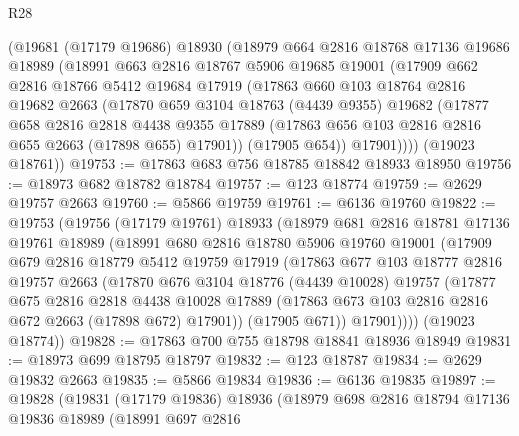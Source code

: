 \begin{lexlean}{R28}
\begin{coremodule}
    (@19681
      (@17179 @19686)
      @18930
      (@18979
        @664
        @2816
        @18768
        @17136
        @19686
        @18989
        (@18991
          @663
          @2816
          @18767
          @5906
          @19685
          @19001
          (@17909
            @662
            @2816
            @18766
            @5412
            @19684
            @17919
            (@17863
              @660
              @103
              @18764
              @2816
              @19682
              @2663
              (@17870
                @659
                @3104
                @18763
                (@4439 @9355)
                @19682
                (@17877
                  @658
                  @2816
                  @2818
                  @4438
                  @9355
                  @17889
                  (@17863 @656 @103 @2816 @2816 @655 @2663 (@17898 @655) @17901))
                (@17905 @654))
              @17901))))
      (@19023 @18761))
@19753 := @17863 @683 @756 @18785 @18842 @18933 @18950
@19756 := @18973 @682 @18782 @18784
@19757 := @123 @18774
@19759 := @2629 @19757 @2663
@19760 := @5866 @19759
@19761 := @6136 @19760
@19822 := @19753
    (@19756
      (@17179 @19761)
      @18933
      (@18979
        @681
        @2816
        @18781
        @17136
        @19761
        @18989
        (@18991
          @680
          @2816
          @18780
          @5906
          @19760
          @19001
          (@17909
            @679
            @2816
            @18779
            @5412
            @19759
            @17919
            (@17863
              @677
              @103
              @18777
              @2816
              @19757
              @2663
              (@17870
                @676
                @3104
                @18776
                (@4439 @10028)
                @19757
                (@17877
                  @675
                  @2816
                  @2818
                  @4438
                  @10028
                  @17889
                  (@17863 @673 @103 @2816 @2816 @672 @2663 (@17898 @672) @17901))
                (@17905 @671))
              @17901))))
      (@19023 @18774))
@19828 := @17863 @700 @755 @18798 @18841 @18936 @18949
@19831 := @18973 @699 @18795 @18797
@19832 := @123 @18787
@19834 := @2629 @19832 @2663
@19835 := @5866 @19834
@19836 := @6136 @19835
@19897 := @19828
    (@19831
      (@17179 @19836)
      @18936
      (@18979
        @698
        @2816
        @18794
        @17136
        @19836
        @18989
        (@18991
          @697
          @2816

\end{coremodule}
\end{lexlean}
